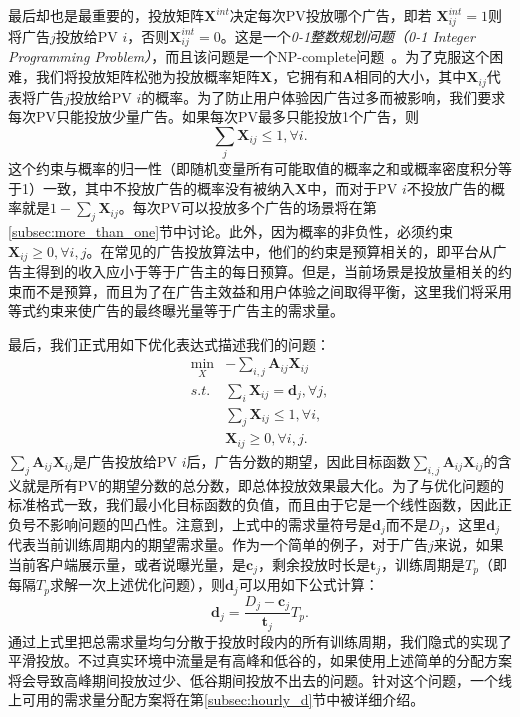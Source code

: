 最后却也是最重要的，投放矩阵$\bm{X}^{int}$决定每次PV投放哪个广告，即若 $\bm{X}^{int}_{ij} = 1$则将广告$j$投放给PV $i$，否则$\bm{X}^{int}_{ij} = 0$。这是一个\textit{0-1整数规划问题（0-1 Integer Programming Problem）}，而且该问题是一个NP-complete问题~\cite{garey2002computers}。为了克服这个困难，我们将投放矩阵松弛为投放概率矩阵$\bm{X}$，它拥有和$\bm{A}$相同的大小，其中$\bm{X}_{ij}$代表将广告$j$投放给PV $i$的概率。为了防止用户体验因广告过多而被影响，我们要求每次PV只能投放少量广告。如果每次PV最多只能投放1个广告，则
\begin{equation}
\sum_j \bm{X}_{ij} \le 1, \forall i.
\end{equation}
这个约束与概率的归一性（即随机变量所有可能取值的概率之和或概率密度积分等于1）一致，其中不投放广告的概率没有被纳入$\bm{X}$中，而对于PV $i$不投放广告的概率就是$1-\sum_j \bm{X}_{ij}$。每次PV可以投放多个广告的场景将在第\ref{subsec:more_than_one}节中讨论。此外，因为概率的非负性，必须约束$\bm{X}_{ij} \ge 0, \forall i,j$。在常见的广告投放算法中，他们的约束是预算相关的，即平台从广告主得到的收入应小于等于广告主的每日预算。但是，当前场景是投放量相关的约束而不是预算，而且为了在广告主效益和用户体验之间取得平衡，这里我们将采用等式约束来使广告的最终曝光量等于广告主的需求量。

最后，我们正式用如下优化表达式描述我们的问题：
\begin{equation}
\begin{aligned}
\min_X &-\sum_{i,j} \bm{A}_{ij}\bm{X}_{ij} \\
s.t. & \sum_i \bm{X}_{ij} = \bm{d}_j, \forall j, \\
& \sum_j \bm{X}_{ij} \le 1, \forall i, \\
& \bm{X}_{ij} \ge 0, \forall i, j. 
\label{eq:ori_opt}
\end{aligned}
\end{equation}
$\sum_{j} \bm{A}_{ij}\bm{X}_{ij}$是广告投放给PV $i$后，广告分数的期望，因此目标函数$\sum_{i,j} \bm{A}_{ij}\bm{X}_{ij}$的含义就是所有PV的期望分数的总分数，即总体投放效果最大化。为了与优化问题的标准格式一致，我们最小化目标函数的负值，而且由于它是一个线性函数，因此正负号不影响问题的凹凸性。注意到，上式中的需求量符号是$\bm{d}_j$而不是$D_j$，这里$\bm{d}_j$代表当前训练周期内的期望需求量。作为一个简单的例子，对于广告$j$来说，如果当前客户端展示量，或者说曝光量，是$\bm{c}_j$，剩余投放时长是$\bm{t}_j$，训练周期是$T_p$（即每隔$T_p$求解一次上述优化问题），则$\bm{d}_j$可以用如下公式计算：
\begin{equation}
\bm{d}_j = \frac{D_j - \bm{c}_j}{\bm{t}_j}T_{p}. \label{eq:avg}
\end{equation}
通过上式里把总需求量均匀分散于投放时段内的所有训练周期，我们隐式的实现了平滑投放。不过真实环境中流量是有高峰和低谷的，如果使用上述简单的分配方案将会导致高峰期间投放过少、低谷期间投放不出去的问题。针对这个问题，一个线上可用的需求量分配方案将在第\ref{subsec:hourly_d}节中被详细介绍。

